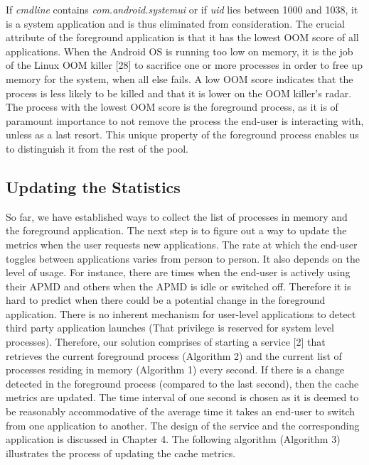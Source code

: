\documentclass[12pt]{uthesis-v12}  %
\begin{document}
			If {\em cmdline} contains {\em com.android.systemui} or if {\em uid} lies between 1000 and 1038, it is a system application and is thus eliminated from consideration. The crucial attribute of the foreground application is that it has the lowest OOM score of all applications. When the Android OS is running too low on memory, it is the job of the Linux OOM killer [28] to sacrifice one or more processes in order to free up memory for the system, when all else fails. A low OOM score indicates that the process is less likely to be killed and that it is lower on the OOM killer's radar. The process with the lowest OOM score is the foreground process, as it is of paramount importance to not remove the process the end-user is interacting with, unless as a last resort. This unique property of the foreground process enables us to distinguish it from the rest of the pool. 
			
		\subsection{Updating the Statistics}
			 So far, we have established ways to collect the list of processes in memory and the foreground application. The next step is to figure out a way to update the metrics when the user requests new applications. The rate at which the end-user toggles between applications varies from person to person. It also depends on the level of usage. For instance, there are times when the end-user is actively using their APMD and others when the APMD is idle or switched off. Therefore it is hard to predict when there could be a potential change in the foreground application. There is no inherent mechanism for user-level applications to detect third party application launches (That privilege is reserved for system level processes). Therefore, our solution comprises of starting a service [2] that retrieves the current foreground process (Algorithm 2) and the current list of processes residing in memory (Algorithm 1) every second. If there is a change detected in the foreground process (compared to the last second), then the cache metrics are updated. The time interval of one second is chosen as it is deemed to be reasonably accommodative of the average time it takes an end-user to switch from one application to another. The design of the service and the corresponding application is discussed in Chapter 4. The following algorithm (Algorithm 3) illustrates the process of updating the cache metrics.\\     
			 
\end{document}
